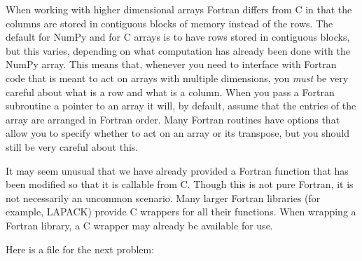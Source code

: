\begin{warn}
When working with higher dimensional arrays Fortran differs from C in that the columns are stored in contiguous blocks of memory instead of the rows.
The default for NumPy and for C arrays is to have rows stored in contiguous blocks, but this varies, depending on what computation has already been done with the NumPy array.
This means that, whenever you need to interface with Fortran code that is meant to act on arrays with multiple dimensions, you \emph{must} be very careful about what is a row and what is a column.
When you pass a Fortran subroutine a pointer to an array it will, by default, assume that the entries of the array are arranged in Fortran order.
Many Fortran routines have options that allow you to specify whether to act on an array or its transpose, but you should still be very careful about this.
\end{warn}

\begin{info}
It may seem unusual that we have already provided a Fortran function that has been modified so that it is callable from C.
Though this is not pure Fortran, it is not necessarily an uncommon scenario.
Many larger Fortran libraries (for example, LAPACK) provide C wrappers for all their functions.
When wrapping a Fortran library, a C wrapper may already be available for use.
\end{info}

Here is a file for the next problem:


